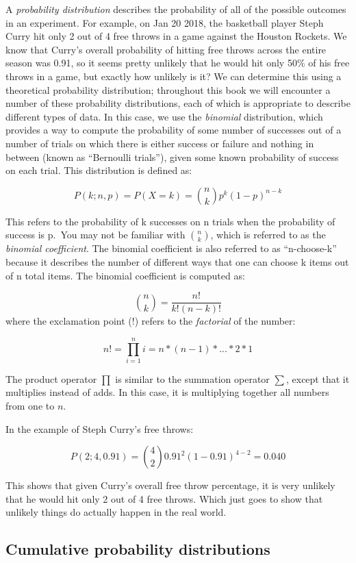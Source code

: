 \documentclass[12pt,]{book}
\theoremstyle{definition}
\theoremstyle{definition}
\theoremstyle{definition}
\theoremstyle{remark}
\begin{document}
A \emph{probability distribution} describes the probability of all of the possible outcomes in an experiment. For example, on Jan 20 2018, the basketball player Steph Curry hit only 2 out of 4 free throws in a game against the Houston Rockets. We know that Curry's overall probability of hitting free throws across the entire season was 0.91, so it seems pretty unlikely that he would hit only 50\% of his free throws in a game, but exactly how unlikely is it? We can determine this using a theoretical probability distribution; throughout this book we will encounter a number of these probability distributions, each of which is appropriate to describe different types of data. In this case, we use the \emph{binomial} distribution, which provides a way to compute the probability of some number of successes out of a number of trials on which there is either success or failure and nothing in between (known as ``Bernoulli trials''), given some known probability of success on each trial. This distribution is defined as:

\[
P(k; n,p) = P(X=k) = \binom{n}{k} p^k(1-p)^{n-k}
\]

This refers to the probability of k successes on n trials when the probability of success is p.~You may not be familiar with \(\binom{n}{k}\), which is referred to as the \emph{binomial coefficient}. The binomial coefficient is also referred to as ``n-choose-k'' because it describes the number of different ways that one can choose k items out of n total items. The binomial coefficient is computed as:

\[
\binom{n}{k} = \frac{n!}{k!(n-k)!}
\]
where the exclamation point (!) refers to the \emph{factorial} of the number:

\[
n! = \prod_{i=1}^n i = n*(n-1)*...*2*1 
\]

The product operator \(\prod\) is similar to the summation operator \(\sum\), except that it multiplies instead of adds. In this case, it is multiplying together all numbers from one to \(n\).

In the example of Steph Curry's free throws:

\[
P(2;4,0.91) = \binom{4}{2} 0.91^2(1-0.91)^{4-2} = 0.040
\]

This shows that given Curry's overall free throw percentage, it is very unlikely that he would hit only 2 out of 4 free throws. Which just goes to show that unlikely things do actually happen in the real world.

\hypertarget{cumulative-probability-distributions}{%
\subsection{Cumulative probability distributions}\label{cumulative-probability-distributions}}
\end{document}
